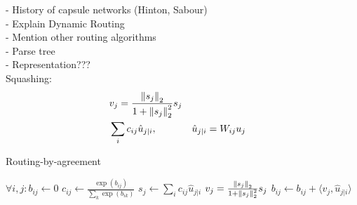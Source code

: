 - History of capsule networks (Hinton, Sabour) \\
- Explain Dynamic Routing \\
- Mention other routing algorithms \\
- Parse tree \\
- Representation??? \\

Squashing:
\begin{equation}
\begin{aligned}
& v_j = \frac{\left \lVert s_j \right \rVert _2}{1 + \left \lVert s_j \right \rVert _2^2} s_j \\
& \sum_{i} c_{ij} \hat{u}_{j \vert i}, & & \hat{u}_{j \vert i} = W_{ij}u_j
\end{aligned}
\end{equation}

\begin{algorithm}
\caption{Routing-by-agreement}
\label{alg:foobar}
\begin{algorithmic}[1]
	
	\State $\forall i,j: b_{ij} \gets 0$
		\State $c_{ij} \gets \frac{\exp(b_{ij})}{\sum_{k}{\exp(b_{ik})}}$ 
		\State $s_j \gets \sum_{i}{c_{ij}\hat{u}_{j \vert i}}$
		\State $v_j = \frac{\left \lVert s_j \right \rVert _2}{1 + \left \lVert s_j \right \rVert _2^2} s_j$ 
		\State $b_{ij} \gets b_{ij} + \langle v_j, \hat{u}_{j \vert i} \rangle$
	\EndFor
\EndProcedure
	
\end{algorithmic}
\end{algorithm}